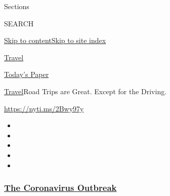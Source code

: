 Sections

SEARCH

\protect\hyperlink{site-content}{Skip to
content}\protect\hyperlink{site-index}{Skip to site index}

\href{https://www.nytimes3xbfgragh.onion/section/travel}{Travel}

\href{https://myaccount.nytimes3xbfgragh.onion/auth/login?response_type=cookie\&client_id=vi}{}

\href{https://www.nytimes3xbfgragh.onion/section/todayspaper}{Today's
Paper}

\href{/section/travel}{Travel}\textbar{}Road Trips are Great. Except for
the Driving.

\url{https://nyti.ms/2Bwy97y}

\begin{itemize}
\item
\item
\item
\item
\item
\end{itemize}

\hypertarget{the-coronavirus-outbreak}{%
\subsubsection{\texorpdfstring{\href{https://www.nytimes3xbfgragh.onion/news-event/coronavirus?name=styln-coronavirus-national\&region=TOP_BANNER\&block=storyline_menu_recirc\&action=click\&pgtype=Article\&impression_id=e718f170-f1ce-11ea-a9f5-3bb13a07ea98\&variant=undefined}{The
Coronavirus
Outbreak}}{The Coronavirus Outbreak}}\label{the-coronavirus-outbreak}}

